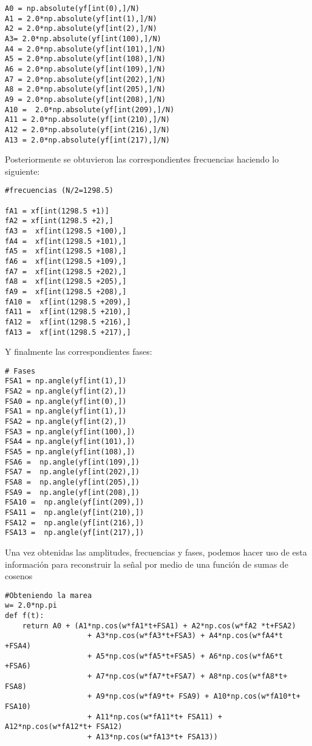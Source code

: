 \documentclass[12pt]{article}
\begin{document}
\begin{verbatim}
A0 = np.absolute(yf[int(0),]/N)
A1 = 2.0*np.absolute(yf[int(1),]/N)
A2 = 2.0*np.absolute(yf[int(2),]/N)
A3= 2.0*np.absolute(yf[int(100),]/N)
A4 = 2.0*np.absolute(yf[int(101),]/N)
A5 = 2.0*np.absolute(yf[int(108),]/N)
A6 = 2.0*np.absolute(yf[int(109),]/N)
A7 = 2.0*np.absolute(yf[int(202),]/N)
A8 = 2.0*np.absolute(yf[int(205),]/N)
A9 = 2.0*np.absolute(yf[int(208),]/N)
A10 =  2.0*np.absolute(yf[int(209),]/N)
A11 = 2.0*np.absolute(yf[int(210),]/N)
A12 = 2.0*np.absolute(yf[int(216),]/N)
A13 = 2.0*np.absolute(yf[int(217),]/N)
\end{verbatim}

Posteriormente se obtuvieron las correspondientes frecuencias haciendo lo siguiente:


\begin{verbatim}
#frecuencias (N/2=1298.5)

fA1 = xf[int(1298.5 +1)]
fA2 = xf[int(1298.5 +2),]
fA3 =  xf[int(1298.5 +100),]
fA4 =  xf[int(1298.5 +101),]
fA5 =  xf[int(1298.5 +108),]
fA6 =  xf[int(1298.5 +109),]
fA7 =  xf[int(1298.5 +202),]
fA8 =  xf[int(1298.5 +205),]
fA9 =  xf[int(1298.5 +208),]
fA10 =  xf[int(1298.5 +209),]
fA11 =  xf[int(1298.5 +210),]
fA12 =  xf[int(1298.5 +216),]
fA13 =  xf[int(1298.5 +217),]
\end{verbatim}

Y finalmente las correspondientes fases:

\begin{verbatim}
# Fases 
FSA1 = np.angle(yf[int(1),])
FSA2 = np.angle(yf[int(2),])
FSA0 = np.angle(yf[int(0),])
FSA1 = np.angle(yf[int(1),])
FSA2 = np.angle(yf[int(2),])
FSA3 = np.angle(yf[int(100),])
FSA4 = np.angle(yf[int(101),])
FSA5 = np.angle(yf[int(108),])
FSA6 =  np.angle(yf[int(109),])
FSA7 =  np.angle(yf[int(202),])
FSA8 =  np.angle(yf[int(205),])
FSA9 =  np.angle(yf[int(208),])
FSA10 =  np.angle(yf[int(209),])
FSA11 =  np.angle(yf[int(210),])
FSA12 =  np.angle(yf[int(216),])
FSA13 =  np.angle(yf[int(217),])

\end{verbatim}

Una vez  obtenidas las amplitudes, frecuencias y fases, podemos hacer uso de esta información para reconstruir la señal por medio de una función de sumas de cosenos 


\begin{verbatim}
#Obteniendo la marea
w= 2.0*np.pi
def f(t):
    return A0 + (A1*np.cos(w*fA1*t+FSA1) + A2*np.cos(w*fA2 *t+FSA2) 
                   + A3*np.cos(w*fA3*t+FSA3) + A4*np.cos(w*fA4*t +FSA4)
                   + A5*np.cos(w*fA5*t+FSA5) + A6*np.cos(w*fA6*t +FSA6)
                   + A7*np.cos(w*fA7*t+FSA7) + A8*np.cos(w*fA8*t+ FSA8)
                   + A9*np.cos(w*fA9*t+ FSA9) + A10*np.cos(w*fA10*t+ FSA10) 
                   + A11*np.cos(w*fA11*t+ FSA11) + A12*np.cos(w*fA12*t+ FSA12)
                   + A13*np.cos(w*fA13*t+ FSA13))
\end{verbatim}
\end{document}
